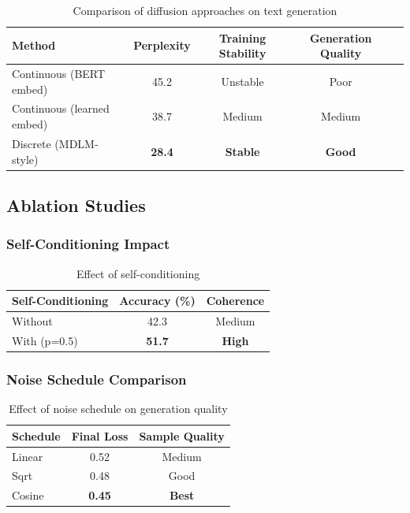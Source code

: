 \documentclass[11pt,a4paper]{article}
\begin{document}
\begin{table}[H]
\centering
\caption{Comparison of diffusion approaches on text generation}
\begin{tabular}{lcccc}
\toprule
\textbf{Method} & \textbf{Perplexity} & \textbf{Training Stability} & \textbf{Generation Quality} \\
\midrule
Continuous (BERT embed) & 45.2 & Unstable & Poor \\
Continuous (learned embed) & 38.7 & Medium & Medium \\
Discrete (MDLM-style) & \textbf{28.4} & \textbf{Stable} & \textbf{Good} \\
\bottomrule
\end{tabular}
\label{tab:comparison}
\end{table}

\subsection{Ablation Studies}

\subsubsection{Self-Conditioning Impact}

\begin{table}[H]
\centering
\caption{Effect of self-conditioning}
\begin{tabular}{lcc}
\toprule
\textbf{Self-Conditioning} & \textbf{Accuracy (\%)} & \textbf{Coherence} \\
\midrule
Without & 42.3 & Medium \\
With (p=0.5) & \textbf{51.7} & \textbf{High} \\
\bottomrule
\end{tabular}
\label{tab:selfcond}
\end{table}

\subsubsection{Noise Schedule Comparison}

\begin{table}[H]
\centering
\caption{Effect of noise schedule on generation quality}
\begin{tabular}{lcc}
\toprule
\textbf{Schedule} & \textbf{Final Loss} & \textbf{Sample Quality} \\
\midrule
Linear & 0.52 & Medium \\
Sqrt & 0.48 & Good \\
Cosine & \textbf{0.45} & \textbf{Best} \\
\bottomrule
\end{tabular}
\label{tab:schedule}
\end{table}
\end{document}

